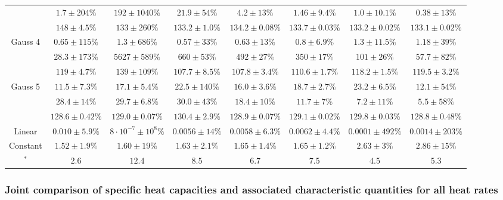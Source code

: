 \documentclass{scrartcl}[12pt, halfparskip]
\numberwithin{equation}{section}
\numberwithin{figure}{section}
\numberwithin{table}{section}
\begin{document}
\begin{landscape}
\begin{table}[H]
\begin{tabular}{| c | c | c | c | c | c | c | c |}
		& $1.7 \pm 204\%$ & $192 \pm 1040\%$ & $21.9 \pm 54\%$ & $4.2 \pm 13\%$ & $1.46 \pm 9.4\%$ & $1.0 \pm 10.1\%$ & $0.38 \pm 13\%$ \\
		& $148 \pm 4.5\%$ & $133 \pm 260\%$ & $133.2 \pm 1.0\%$ & $134.2 \pm 0.08\%$ & $133.7 \pm 0.03\%$ & $133.2 \pm 0.02\%$ & $133.1 \pm 0.02\%$ \\ \hline
		Gauss 4 & $0.65 \pm 115\%$ & $1.3 \pm 686\%$ & $0.57 \pm 33\%$ & $0.63 \pm 13\%$ & $0.8 \pm 6.9\%$ & $1.3 \pm 11.5\%$ & $1.18 \pm 39\%$ \\
		& $28.3 \pm 173\%$ & $5627 \pm 589\%$ & $660 \pm 53\%$ & $492 \pm 27\%$ & $350 \pm 17\%$ & $101 \pm 26\%$ & $57.7 \pm 82\%$ \\
		& $119 \pm 4.7\%$ & $139 \pm 109\%$ & $107.7 \pm 8.5\%$ & $107.8 \pm 3.4\%$ & $110.6 \pm 1.7\%$ & $118.2 \pm 1.5\%$ & $119.5 \pm 3.2\%$ \\ \hline
		Gauss 5 & $11.5 \pm 7.3\%$ & $17.1 \pm 5.4\%$ & $22.5 \pm 140\%$ & $16.0 \pm 3.6\%$ & $18.7 \pm 2.7\%$ & $23.2 \pm 6.5\%$ & $12.1 \pm 54\%$ \\
		& $28.4 \pm 14\%$ & $29.7 \pm 6.8\%$ & $30.0 \pm 43\%$ & $18.4 \pm 10\%$ & $11.7 \pm 7\%$ & $7.2 \pm 11\%$ & $5.5 \pm 58\%$ \\
		& $128.6 \pm 0.42\%$ & $129.0 \pm 0.07\%$ & $130.4 \pm 2.9\%$ & $128.9 \pm 0.07\%$ & $129.1 \pm 0.02\%$ & $129.8 \pm 0.03\%$ & $128.8 \pm 0.48\%$ \\ \hline
		Linear & $0.010 \pm 5.9\%$ & $8 \cdot 10^{-7} \pm 10^8\%$ & $0.0056 \pm 14\%$ & $0.0058 \pm 6.3\%$ & $0.0062 \pm 4.4\%$ & $0.0001 \pm 492\%$ & $0.0014 \pm 203\%$ \\
		Constant & $1.52 \pm 1.9\%$ & $1.60 \pm 19\%$ & $1.63 \pm 2.1\%$ & $1.65 \pm 1.4\%$ & $1.65 \pm 1.2\%$ & $2.63 \pm 3\%$ & $2.86 \pm 15\%$ \\ \hline \hline
		[NOC1]$^*$ & $2.6$ & $12.4$ & $8.5$ & $6.7$ & $7.5$ & $4.5$ & $5.3$ \\ \hline
	\end{tabular}
	\label{tab:parameter_table_5Gaussians}
\end{table}

\end{landscape}
\newpage

\subsubsection{Joint comparison of specific heat capacities and associated characteristic quantities for all heat rates}
\label{sec:param_estimation_Gaussians_joint}
\end{document}
